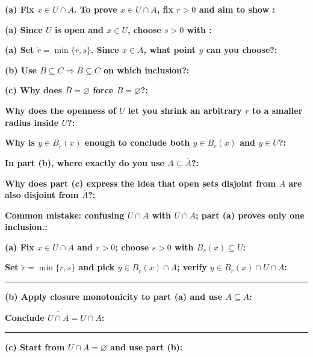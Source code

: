 \documentclass[12pt]{article}
\newcommand{\fillfield}[1]{%
  \par\noindent\textbf{#1:}\enspace\hrulefill\par\vspace{3pt}%
}
\newcommand{\writespace}[1]{\vspace{#1}}
\begin{document}
\bigskip

\begin{tcolorbox}[
  enhanced, breakable,
  colback  = pass2yellow,
  colframe = yellow!65!black,
  fonttitle = \bfseries,
  title = {Pass 2 \enspace\textbf{--}\enspace Proof Recipe Card}
]
\fillfield{(a) Fix $x\in U\cap\overline A$. To prove $x\in\overline{U\cap A}$, fix $r>0$ and aim to show \dotfill}
\fillfield{(a) Since $U$ is open and $x\in U$, choose $s>0$ with \dotfill}
\fillfield{(a) Set $\tilde r = \min\{r,s\}$. Since $x\in\overline A$, what point $y$ can you choose?}
\fillfield{(b) Use $B\subseteq C \Rightarrow \overline B \subseteq \overline C$ on which inclusion?}
\fillfield{(c) Why does $\overline B=\varnothing$ force $B=\varnothing$?}
\end{tcolorbox}

\bigskip

\begin{tcolorbox}[
  enhanced, breakable,
  colback  = pass3orange,
  colframe = orange!65!black,
  fonttitle = \bfseries,
  title = {Pass 3 \enspace\textbf{--}\enspace Self-Explanation}
]
\fillfield{Why does the openness of $U$ let you shrink an arbitrary $r$ to a smaller radius inside $U$?}
\fillfield{Why is $y\in B_{\tilde r}(x)$ enough to conclude both $y\in B_r(x)$ and $y\in U$?}
\fillfield{In part (b), where exactly do you use $A\subseteq \overline A$?}
\fillfield{Why does part (c) express the idea that open sets disjoint from $A$ are also disjoint from $\overline A$?}
\fillfield{Common mistake: confusing $U\cap\overline A$ with $\overline{U\cap A}$; part (a) proves only one inclusion.}
\end{tcolorbox}

\newpage

\begin{tcolorbox}[
  enhanced, breakable,
  colback  = pass4purple,
  colframe = purple!55!black,
  fonttitle = \bfseries,
  title = {Pass 4 \enspace\textbf{--}\enspace Skeleton Proof}
]
\noindent\textbf{(a) Fix $x\in U\cap\overline A$ and $r>0$; choose $s>0$ with $B_s(x)\subseteq U$:}\par
\writespace{1.4cm}
\noindent\textbf{Set $\tilde r=\min\{r,s\}$ and pick $y\in B_{\tilde r}(x)\cap A$; verify $y\in B_r(x)\cap U\cap A$:}\par
\writespace{1.8cm}

\noindent\rule{\linewidth}{0.4pt}\vspace{2pt}

\noindent\textbf{(b) Apply closure monotonicity to part (a) and use $A\subseteq\overline A$:}\par
\writespace{1.6cm}
\noindent\textbf{Conclude $\overline{U\cap\overline A}=\overline{U\cap A}$:}\par
\writespace{1.0cm}

\noindent\rule{\linewidth}{0.4pt}\vspace{2pt}

\noindent\textbf{(c) Start from $U\cap A=\varnothing$ and use part (b):}\par
\writespace{1.4cm}
\end{tcolorbox}
\end{document}
